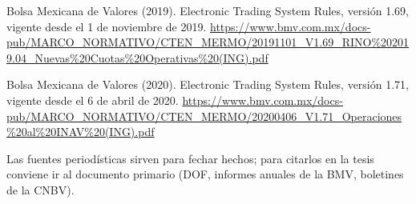 \documentclass[11pt,letterpaper]{article}
\theoremstyle{definition}
\theoremstyle{plain}
\begin{document}
\begin{enumerate}[label={[\arabic*]},leftmargin=*]
\item Bolsa Mexicana de Valores (2019). Electronic Trading System Rules, versión 1.69, vigente desde el 1 de noviembre de 2019. \url{https://www.bmv.com.mx/docs-pub/MARCO_NORMATIVO/CTEN_MERMO/20191101_V1.69_RINO%202019.04_Nuevas%20Cuotas%20Operativas%20(ING).pdf}
\item Bolsa Mexicana de Valores (2020). Electronic Trading System Rules, versión 1.71, vigente desde el 6 de abril de 2020. \url{https://www.bmv.com.mx/docs-pub/MARCO_NORMATIVO/CTEN_MERMO/20200406_V1.71_Operaciones%20al%20INAV%20(ING).pdf}
\end{enumerate}
\small Las fuentes periodísticas sirven para fechar hechos; para citarlos en la tesis conviene ir al documento primario (DOF, informes anuales de la BMV, boletines de la CNBV).
\end{document}
